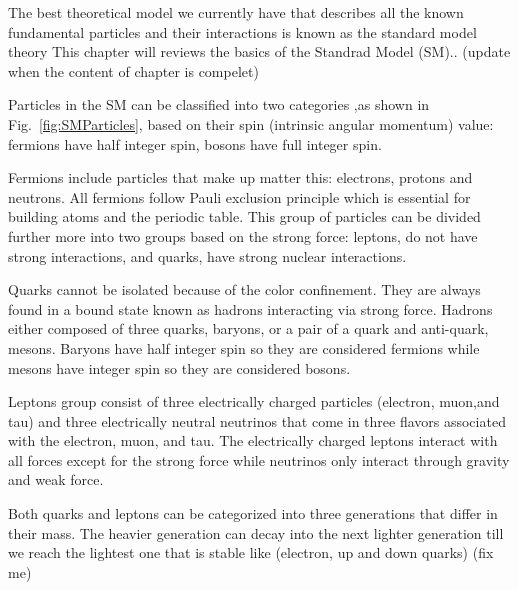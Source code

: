 
The best theoretical model we currently have that describes all the known fundamental particles and their interactions is known as the standard model theory 
This chapter will reviews the basics of the Standrad Model (SM).. (update when the content of chapter is compelet)


Particles in the SM can be classified into two categories ,as shown in Fig.~\ref{fig:SMParticles}, based on their spin (intrinsic angular momentum) value: fermions have half integer spin, bosons have full integer spin.

Fermions include particles that make up matter this: electrons, protons and neutrons. All fermions follow Pauli exclusion principle which is essential for building atoms and the periodic table. This group of particles can be divided further more into two groups based on the strong force: leptons, do not have strong interactions, and quarks, have strong nuclear interactions.

Quarks cannot be isolated because of the color confinement. They are always found in a bound state known as hadrons interacting via strong force. Hadrons either composed of three quarks, baryons, or a pair of a quark and anti-quark, mesons. Baryons have half integer spin so they are considered fermions while mesons have integer spin so they are considered bosons.

Leptons group consist of three electrically charged particles (electron, muon,and tau) and three electrically neutral neutrinos that come in three flavors associated with the electron, muon, and tau. The electrically charged leptons interact with all forces except for the strong force while neutrinos only interact through gravity and weak force.

Both quarks and leptons can be categorized into
three generations that differ in their mass.
The heavier generation can decay into the next lighter generation till we reach the lightest one that is stable like (electron, up and  down quarks) (fix me) %

